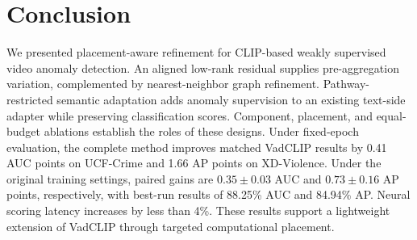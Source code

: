 \FloatBarrier
{}
\section{Conclusion}
We presented placement-aware refinement for CLIP-based weakly supervised video anomaly detection. An aligned low-rank residual supplies pre-aggregation variation, complemented by nearest-neighbor graph refinement. Pathway-restricted semantic adaptation adds anomaly supervision to an existing text-side adapter while preserving classification scores. Component, placement, and equal-budget ablations establish the roles of these designs. Under fixed-epoch evaluation, the complete method improves matched VadCLIP results by 0.41 AUC points on UCF-Crime and 1.66 AP points on XD-Violence. Under the original training settings, paired gains are $0.35\pm0.03$ AUC and $0.73\pm0.16$ AP points, respectively, with best-run results of 88.25\% AUC and 84.94\% AP. Neural scoring latency increases by less than 4\%. These results support a lightweight extension of VadCLIP through targeted computational placement.
